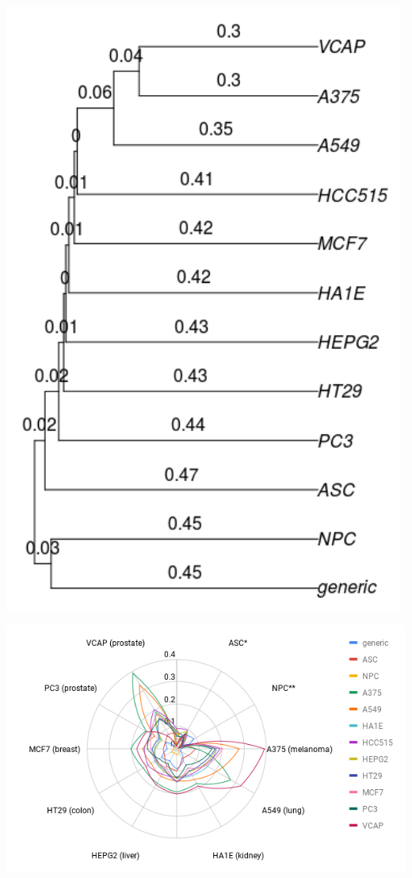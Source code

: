 \documentclass[a0,portrait]{a0poster}
\begin{document}
\begin{multicols}{2}
\begin{multicols}{2}
\includegraphics[width=.75\linewidth]{L1000_jiccard.png}
\end{multicols}

\begin{center}
\hspace{.25cm}\vspace{.1cm}
\includegraphics[width=1\linewidth]{L1000_spider.png}
\end{center}
\vspace{-.3cm}


\end{multicols}
\end{document}
